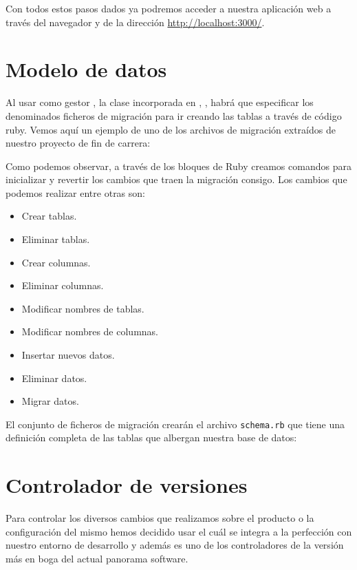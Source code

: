 Con todos estos pasos dados ya podremos acceder a nuestra aplicación web a
través del navegador y de la dirección \url{http://localhost:3000/}.

\section{Modelo de datos}
Al usar como gestor , la clase incorporada en ,
, habrá que especificar los denominados ficheros de
migración para ir creando las tablas a través de código ruby. Vemos aquí un
ejemplo de uno de los archivos de migración extraídos de nuestro proyecto de fin
de carrera:



Como podemos observar, a través de los bloques de Ruby creamos comandos para
inicializar y revertir los cambios que traen la migración consigo. Los cambios
que podemos realizar entre otras son:

\begin{itemize}
\item Crear tablas.
\item Eliminar tablas.
\item Crear columnas.
\item Eliminar columnas.
\item Modificar nombres de tablas.
\item Modificar nombres de columnas.
\item Insertar nuevos datos.
\item Eliminar datos.
\item Migrar datos.
\end{itemize}

El conjunto de ficheros de migración crearán el archivo \texttt{schema.rb} que
tiene una definición completa de las tablas que albergan nuestra base de datos:



\section{Controlador de versiones}
Para controlar los diversos cambios que realizamos sobre el producto o la
configuración del mismo hemos decidido usar  el cuál se integra a
la perfección con nuestro entorno de desarrollo  y además es uno
de los controladores de la versión más en boga del actual panorama software.

